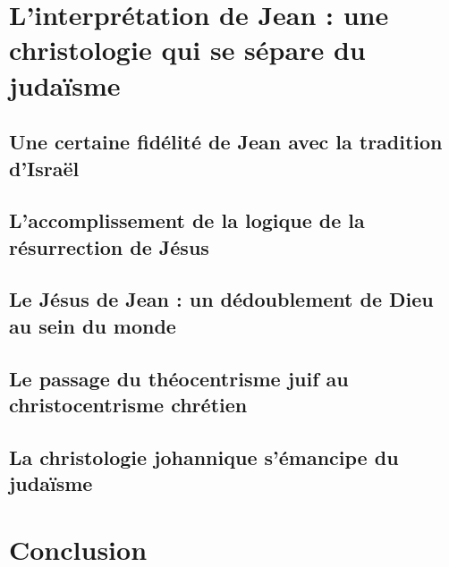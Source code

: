   \hypertarget{linterpruxe9tation-de-jean-une-christologie-qui-se-suxe9pare-du-judauxefsme}{%
  
  \section{L'interprétation de Jean : une christologie qui se sépare du
  judaïsme}\label{linterpruxe9tation-de-jean-une-christologie-qui-se-suxe9pare-du-judauxefsme}}

   
 
   
     
    \subsection{Une certaine fidélité de Jean avec la tradition d'Israël}
     
   
     
    \subsection{L'accomplissement de la logique de la résurrection de Jésus}
     
   
     
    \subsection{Le Jésus de Jean : un dédoublement de Dieu au sein du monde}
     
   
     
    \subsection{Le passage du théocentrisme juif au christocentrisme chrétien}
     
   
     
    \subsection{La christologie johannique s'émancipe du judaïsme}
     
   
 
\hypertarget{conclusion}{%
\section{Conclusion}\label{conclusion}}

